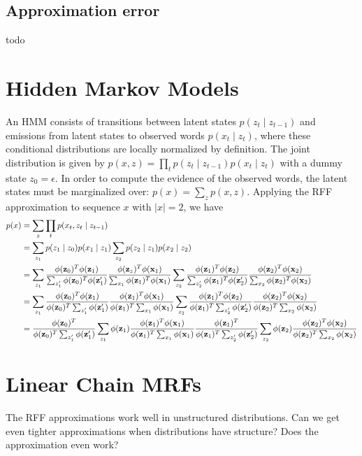 \documentclass{article}
\begin{document}
\subsection{Approximation error}
todo

\section{Hidden Markov Models}
An HMM consists of transitions between latent states $p(z_t \mid z_{t-1})$
and emissions from latent states to observed words $p(x_t \mid z_t)$,
where these conditional distributions are locally normalized by definition.
The joint distribution is given by $p(x, z) = \prod_t p(z_t \mid z_{t-1})p(x_t \mid z_t)$
with a dummy state $z_0 = \epsilon$.
In order to compute the evidence of the observed words, the latent states must be
marginalized over: $p(x) = \sum_z p(x,z)$.
Applying the RFF approximation to sequence $x$ with $|x| = 2$, we have
\begin{equation}
\begin{aligned}
p(x) &= \sum_z \prod_t p(x_t,z_t\mid z_{t-1})\\
&= \sum_{z_1} p(z_1 \mid z_0)p(x_1 \mid z_1)  \sum_{z_2} p(z_2 \mid z_1)p(x_2 \mid z_2)\\
&= \sum_{z_1} \frac{\phi(\mathbf{z}_0)^T\phi(\mathbf{z}_1)}{\sum_{z_1'}\phi(\mathbf{z}_0)^T\phi(\mathbf{z}'_1)}
\frac{\phi(\mathbf{z}_z)^T\phi(\mathbf{x}_1)}{\sum_{x_1}\phi(\mathbf{z}_1)^T\phi(\mathbf{x}_1)}
\sum_{z_2} \frac{\phi(\mathbf{z}_1)^T\phi(\mathbf{z}_2)}{\sum_{z_2'}\phi(\mathbf{z}_1)^T\phi(\mathbf{z}_2')}
\frac{\phi(\mathbf{z}_2)^T\phi(\mathbf{x}_2)}{\sum_{x_2}\phi(\mathbf{z}_2)^T\phi(\mathbf{x}_2)}\\
&= \sum_{z_1} \frac{\phi(\mathbf{z}_0)^T\phi(\mathbf{z}_1)}{\phi(\mathbf{z}_0)^T\sum_{z_1'}\phi(\mathbf{z}'_1)}
\frac{\phi(\mathbf{z}_1)^T\phi(\mathbf{x}_1)}{\phi(\mathbf{z}_1)^T\sum_{x_1}\phi(\mathbf{x}_1)}
\sum_{z_2} \frac{\phi(\mathbf{z}_1)^T\phi(\mathbf{z}_2)}{\phi(\mathbf{z}_1)^T\sum_{z_2'}\phi(\mathbf{z}_2')}
\frac{\phi(\mathbf{z}_2)^T\phi(\mathbf{x}_2)}{\phi(\mathbf{z}_2)^T\sum_{x_2}\phi(\mathbf{x}_2)}\\
&= \frac{\phi(\mathbf{z}_0)^T}{\phi(\mathbf{z}_0)^T\sum_{z_1'}\phi(\mathbf{z}'_1)}\sum_{z_1} \phi(\mathbf{z}_1)
\frac{\phi(\mathbf{z}_1)^T\phi(\mathbf{x}_1)}{\phi(\mathbf{z}_1)^T\sum_{x_1}\phi(\mathbf{x}_1)}
\frac{\phi(\mathbf{z}_1)^T}{\phi(\mathbf{z}_1)^T\sum_{z_2'}\phi(\mathbf{z}_2')}
\sum_{z_2} \phi(\mathbf{z}_2)
\frac{\phi(\mathbf{z}_2)^T\phi(\mathbf{x}_2)}{\phi(\mathbf{z}_2)^T\sum_{x_2}\phi(\mathbf{x}_2)}\\
\end{aligned}
\end{equation}

\section{Linear Chain MRFs}
The RFF approximations work well in unstructured distributions.
Can we get even tighter approximations when distributions have structure?
Does the approximation even work?
\end{document}
